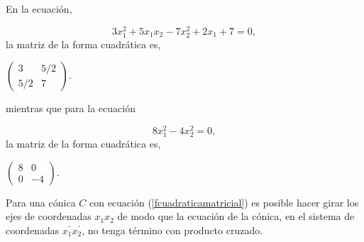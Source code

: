 \begin{example}


En la ecuación,

\begin{equation}
3x_1^{2}+5x_1x_2-7x_2^{2}+ 2 x_1 + 7 = 0, \label{ejemplo61}
\end{equation}
la matriz de la forma cuadrática es, 

\bigskip

$\left(\begin{array}{cc}3 & 5/2 \\ 5/2 & 7
\end{array}
 \right)$.
 
 \bigskip
 
\noindent
mientras que para  la ecuación

\begin{equation}
8x_1^{2}-4x_2^{2} = 0, \label{ejemplo61}
\end{equation}
la matriz de la forma cuadrática es, 

\bigskip

$\left(\begin{array}{cc}8 & 0 \\ 0 & -4
\end{array}
 \right)$.

\end{example}

 \bigskip
 
 Para una cónica  $C$  con ecuación (\ref{fcuadraticamatricial})  es posible hacer girar los ejes de coordenadas $x_1x_2$ de modo que la ecuación de la cónica, en el sistema de coordenadas $x_1^\prime x_2^\prime$, no tenga término con producto cruzado.  
 
